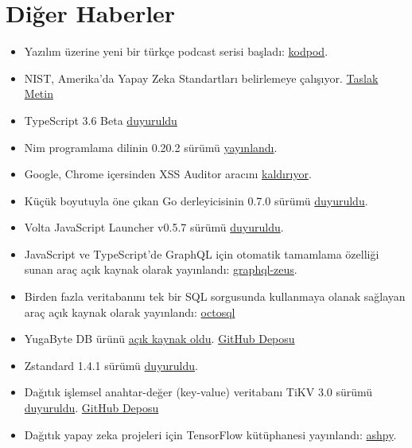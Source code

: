 \documentclass[11pt]{article}
\begin{document}
\section{Diğer Haberler}
\label{sec:org89173a3}
\begin{itemize}
\item Yazılım üzerine yeni bir türkçe podcast serisi başladı: \href{https://kodpod.live/}{kodpod}.
\item NIST, Amerika'da Yapay Zeka Standartları belirlemeye çalışıyor. \href{https://www.nist.gov/sites/default/files/documents/2019/07/02/plan\_for\_ai\_standards\_publicreview\_2july2019.pdf}{Taslak Metin}
\item TypeScript 3.6 Beta \href{https://devblogs.microsoft.com/typescript/announcing-typescript-3-6-beta/}{duyuruldu}
\item Nim programlama dilinin 0.20.2 sürümü \href{https://nim-lang.org/blog/2019/07/17/version-0202-released.html}{yayınlandı}.
\item Google, Chrome içersinden XSS Auditor aracını \href{https://nakedsecurity.sophos.com/2019/07/18/google-chrome-is-ditching-its-xss-detection-tool/}{kaldırıyor}.
\item Küçük boyutuyla öne çıkan Go derleyicisinin 0.7.0 sürümü \href{https://github.com/tinygo-org/tinygo/releases/tag/v0.7.0}{duyuruldu}.
\item Volta JavaScript Launcher v0.5.7 sürümü \href{https://github.com/volta-cli/volta/releases/tag/v0.5.7}{duyuruldu}.
\item JavaScript ve TypeScript'de GraphQL için otomatik tamamlama özelliği sunan
araç açık kaynak olarak yayınlandı: \href{https://github.com/graphql-editor/graphql-zeus}{graphql-zeus}.
\item Birden fazla veritabanını tek bir SQL sorgusunda kullanmaya olanak sağlayan
araç açık kaynak olarak yayınlandı: \href{https://github.com/cube2222/octosql}{octosql}
\item YugaByte DB ürünü \href{https://blog.yugabyte.com/why-we-changed-yugabyte-db-licensing-to-100-open-source/}{açık kaynak oldu}. \href{https://github.com/YugaByte/yugabyte-db}{GitHub Deposu}
\item Zstandard 1.4.1 sürümü \href{https://github.com/facebook/zstd/releases/tag/v1.4.1}{duyuruldu}.
\item Dağıtık işlemsel anahtar-değer (key-value) veritabanı TiKV 3.0 sürümü
\href{https://tikv.org/blog/tikv-3.0ga/}{duyuruldu}. \href{https://github.com/tikv/tikv}{GitHub Deposu}
\item Dağıtık yapay zeka projeleri için TensorFlow kütüphanesi yayınlandı: \href{https://github.com/zurutech/ashpy}{ashpy}.

\end{itemize}
\end{document}
